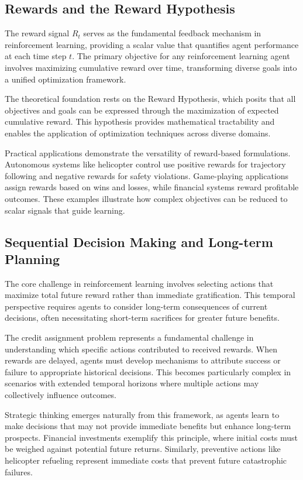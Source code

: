 \subsection{Rewards and the Reward Hypothesis}

    The reward signal $R_t$ serves as the fundamental feedback mechanism in reinforcement learning, providing a scalar value that quantifies agent performance at each time step $t$. The primary objective for any reinforcement learning agent involves maximizing cumulative reward over time, transforming diverse goals into a unified optimization framework.
    
    The theoretical foundation rests on the Reward Hypothesis, which posits that all objectives and goals can be expressed through the maximization of expected cumulative reward. This hypothesis provides mathematical tractability and enables the application of optimization techniques across diverse domains.
    
    Practical applications demonstrate the versatility of reward-based formulations. Autonomous systems like helicopter control use positive rewards for trajectory following and negative rewards for safety violations. Game-playing applications assign rewards based on wins and losses, while financial systems reward profitable outcomes. These examples illustrate how complex objectives can be reduced to scalar signals that guide learning.


\subsection{Sequential Decision Making and Long-term Planning}

    The core challenge in reinforcement learning involves selecting actions that maximize total future reward rather than immediate gratification. This temporal perspective requires agents to consider long-term consequences of current decisions, often necessitating short-term sacrifices for greater future benefits.
    
    The credit assignment problem represents a fundamental challenge in understanding which specific actions contributed to received rewards. When rewards are delayed, agents must develop mechanisms to attribute success or failure to appropriate historical decisions. This becomes particularly complex in scenarios with extended temporal horizons where multiple actions may collectively influence outcomes.
    
    Strategic thinking emerges naturally from this framework, as agents learn to make decisions that may not provide immediate benefits but enhance long-term prospects. Financial investments exemplify this principle, where initial costs must be weighed against potential future returns. Similarly, preventive actions like helicopter refueling represent immediate costs that prevent future catastrophic failures.


